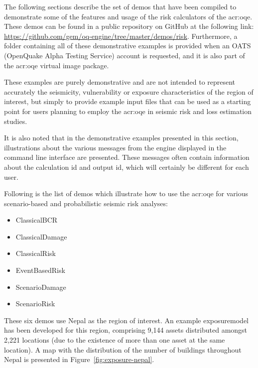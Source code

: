 The following sections describe the set of demos that have been compiled to
demonstrate some of the features and usage of the risk calculators of the
\glsdesc{acr:oqe}. These demos can be found in a public repository on GitHub at
the following link:
\href{https://github.com/gem/oq-engine/tree/master/demos/risk}
{https://github.com/gem/oq-engine/tree/master/demos/risk}.
Furthermore, a folder containing all of these
demonstrative examples is provided when an OATS (OpenQuake Alpha Testing
Service) account is requested, and it is also part of the \gls{acr:oqe}
virtual image package.

These examples are purely demonstrative and are not intended to represent
accurately the seismicity, vulnerability or exposure characteristics of the
region of interest, but simply to provide example input files that can be used
as a starting point for users planning to employ the \glsdesc{acr:oqe} in seismic
risk and loss estimation studies.

It is also noted that in the demonstrative examples presented in this section,
illustrations about the various messages from the engine displayed in the
command line interface are presented. These messages often contain information
about the calculation id and output id, which will certainly be different for
each user.

Following is the list of demos which illustrate how to use the \gls{acr:oqe} for
various scenario-based and probabilistic seismic risk analyses:

\begin{itemize}

    \item ClassicalBCR
	\item ClassicalDamage
    \item ClassicalRisk
    \item EventBasedRisk
    \item ScenarioDamage
    \item ScenarioRisk

\end{itemize}

These six demos use Nepal as the region of interest. An example
\gls{exposuremodel} has been developed for this region, comprising 9,144
assets distributed amongst 2,221 locations (due to the existence of more than
one \gls{asset} at the same location). A map with the distribution of the
number of buildings throughout Nepal is presented in Figure~\ref{fig:exposure-nepal}.

